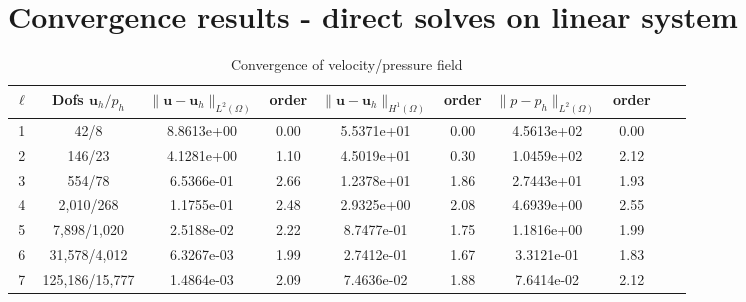 \documentclass{article}
\newcommand{\uu}[1]{\boldsymbol #1}
\begin{document}
\newpage

\section*{Convergence results - direct solves on linear system}

\begin{table}[h!]
\begin{center}
\begin{tabular}{cccccccccc}
\hline
$\ell$ &    Dofs $\uu{u}_h/p_h$ & $\|\uu{u}-\uu{u}_h\|_{L^2(\Omega)}$ & order & $\|\uu{u}-\uu{u}_h\|_{H^1(\Omega)}$ & order  &  $\|{p}-{p}_h\|_{L^2(\Omega)}$ & order \\
\hline
 1 & 42/8 &  8.8613e+00 &     0.00 &  5.5371e+01 &     0.00 &  4.5613e+02 &      0.00 \\
 2 & 146/23 &  4.1281e+00 &     1.10 &  4.5019e+01 &     0.30 &  1.0459e+02 &      2.12 \\
 3 & 554/78 &  6.5366e-01 &     2.66 &  1.2378e+01 &     1.86 &  2.7443e+01 &      1.93 \\
 4 & 2,010/268 &  1.1755e-01 &     2.48 &  2.9325e+00 &     2.08 &  4.6939e+00 &      2.55 \\
 5 & 7,898/1,020 &  2.5188e-02 &     2.22 &  8.7477e-01 &     1.75 &  1.1816e+00 &      1.99 \\
 6 & 31,578/4,012 &  6.3267e-03 &     1.99 &  2.7412e-01 &     1.67 &  3.3121e-01 &      1.83 \\
 7 & 125,186/15,777 &  1.4864e-03 &     2.09 &  7.4636e-02 &     1.88 &  7.6414e-02 &      2.12 \\
\hline
\end{tabular}
\caption{Convergence of velocity/pressure field}
\label{tab:NS_2D_smooth_velocity}
\end{center}
\end{table}
\end{document}
